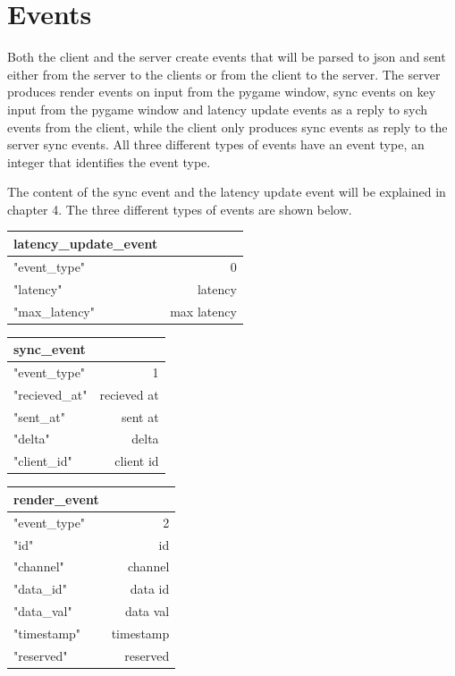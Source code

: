 \section{Events}
Both the client and the server create events that will be parsed to json and sent either from the server to the clients or from the client to the server. The server produces render events on input from the pygame window, sync events on key input from the pygame window and latency update events as a reply to sych events from the client, while the client only produces sync events as reply to the server sync events. All three different types of events have an event type, an integer that identifies the event type.

The content of the sync event and the latency update event will be explained in chapter 4. The three different types of events are shown below. 

\begin{tabular}{ l | r }
  latency\_update\_event \\
  \hline                        
  "event\_type" & 0 \\
  "latency" & latency \\
  "max\_latency" & max latency \\
  \hline  
\end{tabular}

\begin{tabular}{ l | r }
  sync\_event \\
  \hline                        
  "event\_type" & 1 \\
  "recieved\_at" & recieved at \\
  "sent\_at" & sent at \\
  "delta" & delta \\
  "client\_id" & client id \\
  \hline  
\end{tabular}

\begin{tabular}{ l | r }
  render\_event \\
  \hline                        
  "event\_type" & 2 \\
  "id" & id \\
  "channel" & channel \\
  "data\_id" & data id \\
  "data\_val" & data val \\
  "timestamp" & timestamp \\
  "reserved" & reserved \\
  \hline  
\end{tabular}

